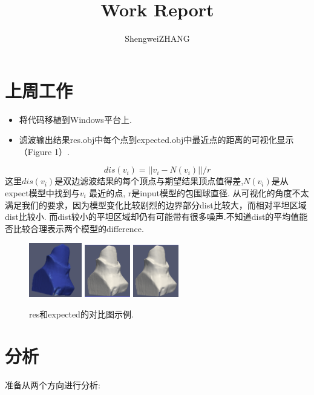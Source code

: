 \documentclass{article}
\title{Work Report}
\author{ShengweiZHANG\\
}
\theoremstyle{definition}
\theoremstyle{remark}
\begin{document}
\maketitle

\section{上周工作}
\begin{itemize}
	\item 将代码移植到Windows平台上.
	\item 滤波输出结果res.obj中每个点到expected.obj中最近点的距离的可视化显示（Figure 1）. 
\end{itemize}
\begin{equation}
	dis(v_i) = ||v_i -N(v_i)||/r
\end{equation}
这里$dis(v_i)$是双边滤波结果的每个顶点与期望结果顶点值得差,$N(v_i)$是从expect模型中找到与$v_i$ 最近的点, r是input模型的包围球直径.
从可视化的角度不太满足我们的要求，因为模型变化比较剧烈的边界部分dist比较大，而相对平坦区域dist比较小. 而dist较小的平坦区域却仍有可能带有很多噪声.不知道dist的平均值能否比较合理表示两个模型的difference.
\begin{figure}[H]
	\onecolumn
	\includegraphics[width=2.3cm]{diffv}
	\includegraphics[width=2cm]{our_basic}
	\includegraphics[width=2cm]{smooth_1}
	\centering
	\caption[res和expected的对比图示例]
	{res和expected的对比图示例.}
	\centering
\end{figure}

\section{分析}
准备从两个方向进行分析:
\end{document}

